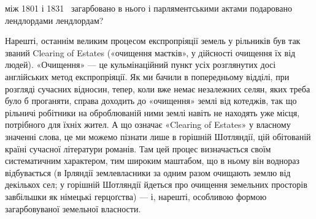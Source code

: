 \parcont{}  %
між 1801 і 1831~ загарбовано в нього і парляментськими актами подаровано
лендлордами лендлордам?

Нарешті, останнім великим процесом експропріяції земель у
рільників був так званий Clearing of Estates («очищення маєтків»,
у дійсності очищення їх від людей). «Очищення» — це кульмінаційний
пункт усіх розглянутих досі англійських метод експропріяції.
Як ми бачили в попередньому відділі, при розгляді сучасних відносин,
тепер, коли вже немає незалежних селян, яких треба було б проганяти,
справа доходить до «очищення» землі від котеджів, так що рільничі
робітники на оброблюваній ними землі навіть не находять уже місця,
потрібного для їхніх жител. А що означає «Clearing of Estates» у
власному значенні слова, це ми можемо пізнати лише в горішній Шотляндії,
цій обітованій країні сучасної літератури романів. Там цей процес
визначається своїм систематичним характером, тим широким маштабом,
що в ньому він воднораз відбувається (в Ірляндії землевласники за
одним разом очищають землю від декількох сел; у горішній
Шотляндії йдеться про очищення земельних просторів
завбільшки як німецькі герцоґства) — і, нарешті, особливою формою
загарбовуваної земельної власности.

